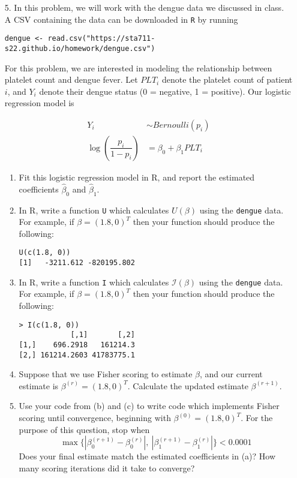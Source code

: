 \documentclass[11pt]{article}
\begin{document}
\begin{enumerate}
\newpage

\item[5.] In this problem, we will work with the dengue data we discussed in class. A CSV containing the data can be downloaded in \texttt{R} by running
\begin{center}
\texttt{dengue <- read.csv("https://sta711-s22.github.io/homework/dengue.csv")}
\end{center}

For this problem, we are interested in modeling the relationship between platelet count and dengue fever. Let $PLT_i$ denote the platelet count of patient $i$, and $Y_i$ denote their dengue status (0 = negative, 1 = positive). Our logistic regression model is

\begin{align*}
Y_i &\sim Bernoulli(p_i)\\
\log \left( \dfrac{p_i}{1 - p_i} \right) &= \beta_0 + \beta_1 PLT_i
\end{align*}

\begin{enumerate}
\item Fit this logistic regression model in R, and report the estimated coefficients $\widehat{\beta}_0$ and $\widehat{\beta}_1$.
\item In R, write a function \texttt{U} which calculates $U(\beta)$ using the \texttt{dengue} data. For example, if $\beta = (1.8, 0)^T$ then your function should produce the following:

\begin{verbatim}
U(c(1.8, 0))
[1]   -3211.612 -820195.802
\end{verbatim}

\item In R, write a function \texttt{I} which calculates $\mathcal{I}(\beta)$ using the \texttt{dengue} data. For example, if $\beta = (1.8, 0)^T$ then your function should produce the following:

\begin{verbatim}
> I(c(1.8, 0))
            [,1]       [,2]
[1,]    696.2918   161214.3
[2,] 161214.2603 41783775.1
\end{verbatim}

\item Suppose that we use Fisher scoring to estimate $\beta$, and our current estimate is $\beta^{(r)} = (1.8, 0)^T$. Calculate the updated estimate $\beta^{(r+1)}$.

\item Use your code from (b) and (c) to write code which implements Fisher scoring until convergence, beginning with $\beta^{(0)} = (1.8, 0)^T$. For the purpose of this question, stop when 
$$\max \{ |\beta_0^{(r+1)} - \beta_0^{(r)}|, \ |\beta_1^{(r+1)} - \beta_1^{(r)}| \} < 0.0001$$
Does your final estimate match the estimated coefficients in (a)? How many scoring iterations did it take to converge?


\end{enumerate}
\end{enumerate}
\end{document}

